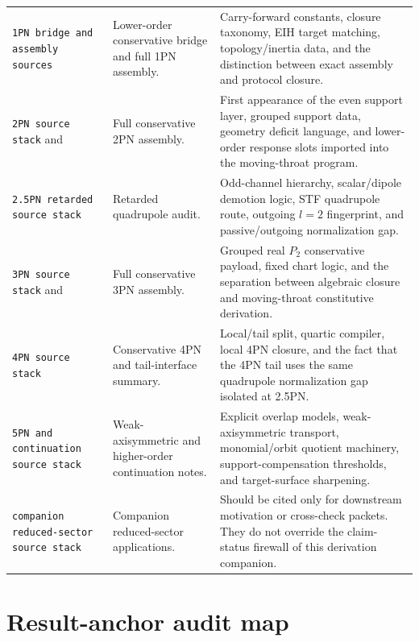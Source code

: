 \begin{longtable}{@{}L{0.29\textwidth}L{0.29\textwidth}L{0.33\textwidth}@{}}
\addlinespace
\begingroup\footnotesize\texttt{1PN bridge and assembly sources}\endgroup{} & Lower-order conservative bridge and full 1PN assembly. & Carry-forward constants, closure taxonomy, EIH target matching, topology/inertia data, and the distinction between exact assembly and protocol closure. \\
\addlinespace
\begingroup\footnotesize\texttt{2PN source stack}\endgroup{} and  & Full conservative 2PN assembly. & First appearance of the even support layer, grouped support data, geometry deficit language, and lower-order response slots imported into the moving-throat program. \\
\addlinespace
\begingroup\footnotesize\texttt{2.5PN retarded source stack}\endgroup{} & Retarded quadrupole audit. & Odd-channel hierarchy, scalar/dipole demotion logic, STF quadrupole route, outgoing \(l=2\) fingerprint, and passive/outgoing normalization gap. \\
\addlinespace
\begingroup\footnotesize\texttt{3PN source stack}\endgroup{} and  & Full conservative 3PN assembly. & Grouped real \(P_2\) conservative payload, fixed chart logic, and the separation between algebraic closure and moving-throat constitutive derivation. \\
\addlinespace
\begingroup\footnotesize\texttt{4PN source stack}\endgroup{} & Conservative 4PN and tail-interface summary. & Local/tail split, quartic compiler, local 4PN closure, and the fact that the 4PN tail uses the same quadrupole normalization gap isolated at 2.5PN. \\
\addlinespace
\begingroup\footnotesize\texttt{5PN and continuation source stack}\endgroup{} & Weak-axisymmetric and higher-order continuation notes. & Explicit overlap models, weak-axisymmetric transport, monomial/orbit quotient machinery, support-compensation thresholds, and target-surface sharpening. \\
\addlinespace
\begingroup\footnotesize\texttt{companion reduced-sector source stack}\endgroup{} & Companion reduced-sector applications. & Should be cited only for downstream motivation or cross-check packets.  They do not override the claim-status firewall of this derivation companion. \\
\bottomrule
\end{longtable}

\section{Result-anchor audit map}
\label{sec:result-anchor-audit-map}

